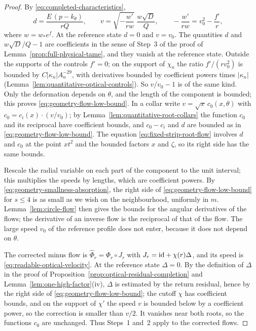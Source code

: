 \begin{proof}
By \eqref{eq:completed-characteristics},
\[
 d=\frac{E\,(p-k_\theta)}{rQ},\qquad
 v=\sqrt{-\frac{w'}{rw}}\;\frac{w\sqrt D}{Q},
 \qquad -\frac{w'}{rw}=v_0^2-\frac{f'}r,
\]
where $w=w_*e^f$. At the reference state $d=0$ and $v=v_0$. The
quantities $d$ and $w\sqrt D/Q-1$ are coefficients in the sense of
Step~3 of the proof of Lemma~\ref{prop:full-physical-tame}, and they
vanish at the reference state. Outside the supports of the controls
$f'=0$; on the support of $\chi_n$ the ratio $f'/(rv_0^2)$ is bounded
by $C|\kappa_n|A_n^{-29}$, with derivatives bounded by coefficient
powers times $|\kappa_n|$
(Lemma~\ref{lem:quantitative-optical-controls}). So $v/v_0-1$ is of
the same kind. Only the deformation depends on $\theta$, and the
length of the component is bounded; this proves
\eqref{eq:geometry-flow-low-bound}. In a collar write
$v=\sqrt x\,c_0(x,\theta)$ with
$c_0=c_i(x)\cdot(v/v_0)$; by Lemma~\ref{lem:quantitative-root-collars}
the function $c_0$ and its reciprocal have coefficient bounds, and
$c_0-c_i$ and $d$ are bounded as in
\eqref{eq:geometry-flow-low-bound}. The equation
\eqref{eq:fixed-strip-root-flow} involves $d$ and $c_0$ at the point
$xt^2$ and the bounded factors $x$ and $\zeta$, so its right side has
the same bounds.

Rescale the radial variable on each part of the component to the unit
interval; this multiplies the speeds by lengths, which are coefficient
powers. By \eqref{eq:geometry-smallness-absorption}, the right side of
\eqref{eq:geometry-flow-low-bound} for $s\le4$ is as small as we wish
on the neighbourhood, uniformly in $m$. Lemma~\ref{lem:circle-flow}
then gives the bounds for the angular derivatives of the flows; the
derivative of an inverse flow is the reciprocal of that of the flow.
The large speed $v_0$ of the reference profile does not enter,
because it does not depend on $\theta$.

The corrected minus flow is $\widehat\Phi_r=\Phi_r\circ J_r$ with
$J_r=\mathrm{id}+\chi(r)\Delta$, and its speed is
\eqref{eq:readable-optical-velocity}. At the reference state
$\Delta=0$. By the definition of $\Delta$ in the proof of
Proposition~\ref{prop:optical-residual-completion} and
Lemma~\ref{lem:one-high-factor}(iv), $\Delta$ is estimated by the
return residual, hence by the right side of
\eqref{eq:geometry-flow-low-bound}; the cutoff $\chi$ has
coefficient bounds, and on the support of $\chi'$ the speed $v$ is
bounded below by a coefficient power, so the correction is smaller
than $v/2$. It vanishes near both roots, so the functions $c_0$ are
unchanged. Thus Steps~1 and~2 apply to the corrected flows.
\end{proof}

